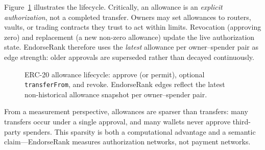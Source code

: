 Figure~\ref{fig:allowance-sequence} illustrates the lifecycle. Critically, an allowance is an \emph{explicit authorization}, not a completed transfer. Owners may set allowances to routers, vaults, or trading contracts they trust to act within limits. Revocation (approving zero) and replacement (a new non-zero allowance) update the live authorization state. EndorseRank therefore uses the \emph{latest} allowance per owner--spender pair as edge strength: older approvals are superseded rather than decayed continuously.

\begin{figure}[htbp]
\centering
{}
\caption{ERC-20 allowance lifecycle: approve (or permit), optional \texttt{transferFrom}, and revoke. EndorseRank edges reflect the latest non-historical allowance snapshot per owner--spender pair.}
\label{fig:allowance-sequence}
\end{figure}

From a measurement perspective, allowances are sparser than transfers: many transfers occur under a single approval, and many wallets never approve third-party spenders. This sparsity is both a computational advantage and a semantic claim---EndorseRank measures authorization networks, not payment networks.

